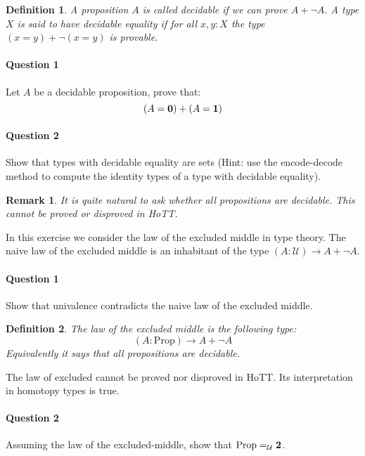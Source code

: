 \documentclass{article}[6pt]%
\newcommand{\U}{{\mathcal U}}
\renewcommand{\r}{\rightarrow}
\newcommand{\one}{{\bf 1}}
\newcommand{\zero}{{\bf 0}}
\newcommand{\two}{{\bf 2}}
\newcommand{\Prop}{\mathrm{Prop}}
\newtheorem{definition}{Definition}
\newtheorem{remark}{Remark}
\begin{document}
\begin{Exercise}[title={Decidable types and propositions}]


\begin{definition}
A proposition $A$ is called decidable if we can prove $A+\lnot A$. A type $X$ is said to have decidable equality if for all $x,y:X$ the type $(x=y)+\lnot(x=y)$ is provable.
\end{definition}

\paragraph{Question 1} Let $A$ be a decidable proposition, prove that:
\[(A=\zero) + (A=\one)\]

\paragraph{Question 2} Show that types with decidable equality are sets (Hint: use the encode-decode method to compute the identity types of a type with decidable equality).

\begin{remark}
It is quite natural to ask whether all propositions are decidable. This cannot be proved or disproved in HoTT.
\end{remark}

\end{Exercise}


\begin{Exercise}[title={The law of the excluded middle}]
In this exercise we consider the law of the excluded middle in type theory. The naive law of the excluded middle is an inhabitant of the type $(A:\U)\r A+\lnot A$.

\paragraph{Question 1} Show that univalence contradicts the naive law of the excluded middle.

\begin{definition}
The law of the excluded middle is the following type:
\[(A:\Prop)\r A + \lnot A\]
Equivalently it says that all propositions are decidable.
\end{definition}

The law of excluded cannot be proved nor disproved in HoTT. Its interpretation in homotopy types is true. 

\paragraph{Question 2} Assuming the law of the excluded-middle, show that $\Prop =_\U \two$.

\end{Exercise}
\end{document}
